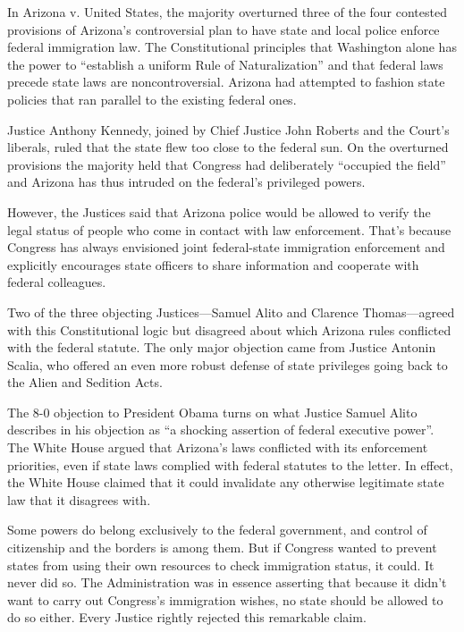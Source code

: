 In Arizona v. United States, the majority overturned three of the
four contested provisions of Arizona's controversial plan to have state
and local police enforce federal immigration law. The Constitutional
principles that Washington alone has the power to ``establish a uniform
Rule of Naturalization'' and that federal laws precede state laws are
noncontroversial. Arizona had attempted to fashion state policies that
ran parallel to the existing federal ones.

Justice Anthony Kennedy, joined by Chief Justice John Roberts and the
Court's liberals, ruled that the state flew too close to the federal
sun. On the overturned provisions the majority held that Congress had
deliberately ``occupied the field'' and Arizona has thus intruded on the
federal's privileged powers.

However, the Justices said that Arizona police would be allowed to
verify the legal status of people who come in contact with law
enforcement. That's because Congress has always envisioned joint
federal-state immigration enforcement and explicitly encourages state
officers to share information and cooperate with federal colleagues.

Two of the three objecting Justices---Samuel Alito and Clarence
Thomas---agreed with this Constitutional logic but disagreed about which
Arizona rules conflicted with the federal statute. The only major
objection came from Justice Antonin Scalia, who offered an even more
robust defense of state privileges going back to the Alien and Sedition
Acts.

The 8-0 objection to President Obama turns on what Justice Samuel Alito
describes in his objection as ``a shocking assertion of federal
executive power''. The White House argued that Arizona's laws conflicted
with its enforcement priorities, even if state laws complied with
federal statutes to the letter. In effect, the White House claimed that
it could invalidate any otherwise legitimate state law that it disagrees
with.

Some powers do belong exclusively to the federal government, and control
of citizenship and the borders is among them. But if Congress wanted to
prevent states from using their own resources to check immigration
status, it could. It never did so. The Administration was in essence
asserting that because it didn't want to carry out Congress's
immigration wishes, no state should be allowed to do so either. Every
Justice rightly rejected this remarkable claim.


